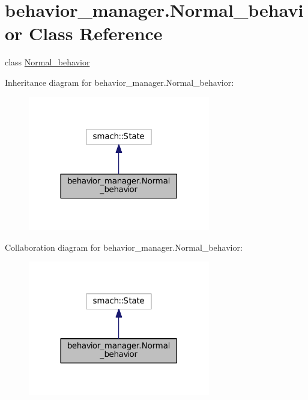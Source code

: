 \hypertarget{classbehavior__manager_1_1Normal__behavior}{}\section{behavior\+\_\+manager.\+Normal\+\_\+behavior Class Reference}
\label{classbehavior__manager_1_1Normal__behavior}


class \hyperlink{classbehavior__manager_1_1Normal__behavior}{Normal\+\_\+behavior}  




Inheritance diagram for behavior\+\_\+manager.\+Normal\+\_\+behavior\+:\nopagebreak
\begin{figure}[H]
\begin{center}
\leavevmode
\includegraphics[width=225pt]{classbehavior__manager_1_1Normal__behavior__inherit__graph}
\end{center}
\end{figure}


Collaboration diagram for behavior\+\_\+manager.\+Normal\+\_\+behavior\+:\nopagebreak
\begin{figure}[H]
\begin{center}
\leavevmode
\includegraphics[width=225pt]{classbehavior__manager_1_1Normal__behavior__coll__graph}
\end{center}
\end{figure}
